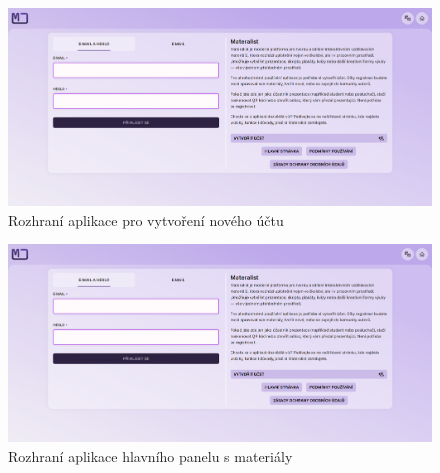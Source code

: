 \begin{figure}[ht!]
    \centering
    \includegraphics[width=1\textwidth,page=7]{media/appendix/uzivatelskeProstredi.pdf}
    \caption{Rozhraní aplikace pro vytvoření nového účtu}
\end{figure}


\begin{figure}[ht!]
    \centering
    \includegraphics[width=1\textwidth,page=2]{media/appendix/uzivatelskeProstredi.pdf}
    \caption{Rozhraní aplikace hlavního panelu s materiály}
\end{figure}

